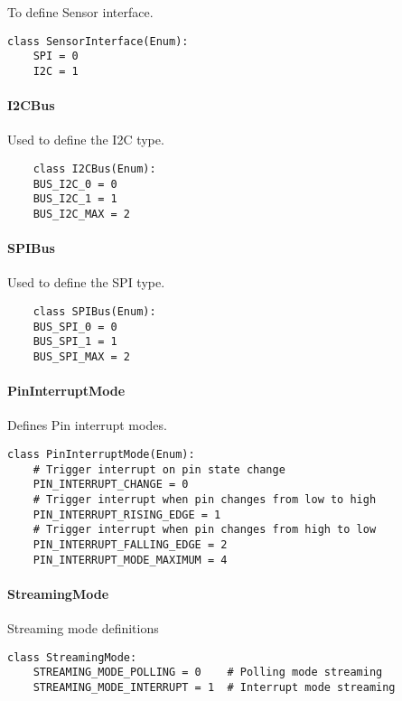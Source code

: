 To define Sensor interface.

\begin{lstlisting}
class SensorInterface(Enum):
	SPI = 0
	I2C = 1
\end{lstlisting}

\paragraph{I2CBus}\label{I2CBus}

Used to define the I2C type.

\begin{lstlisting}
	class I2CBus(Enum):
	BUS_I2C_0 = 0
	BUS_I2C_1 = 1
	BUS_I2C_MAX = 2
\end{lstlisting}

\paragraph{SPIBus}\label{SPIBus}

Used to define the SPI type.

\begin{lstlisting}
	class SPIBus(Enum):
	BUS_SPI_0 = 0
	BUS_SPI_1 = 1
	BUS_SPI_MAX = 2
\end{lstlisting}

\paragraph{PinInterruptMode}\label{PinInterruptMode}

Defines Pin interrupt modes.

\begin{lstlisting}
class PinInterruptMode(Enum):
	# Trigger interrupt on pin state change
	PIN_INTERRUPT_CHANGE = 0
	# Trigger interrupt when pin changes from low to high
	PIN_INTERRUPT_RISING_EDGE = 1
	# Trigger interrupt when pin changes from high to low
	PIN_INTERRUPT_FALLING_EDGE = 2
	PIN_INTERRUPT_MODE_MAXIMUM = 4
\end{lstlisting}

\paragraph{StreamingMode}\label{StreamingMode}

Streaming mode definitions

\begin{lstlisting}
class StreamingMode:
    STREAMING_MODE_POLLING = 0    # Polling mode streaming
    STREAMING_MODE_INTERRUPT = 1  # Interrupt mode streaming
\end{lstlisting}

